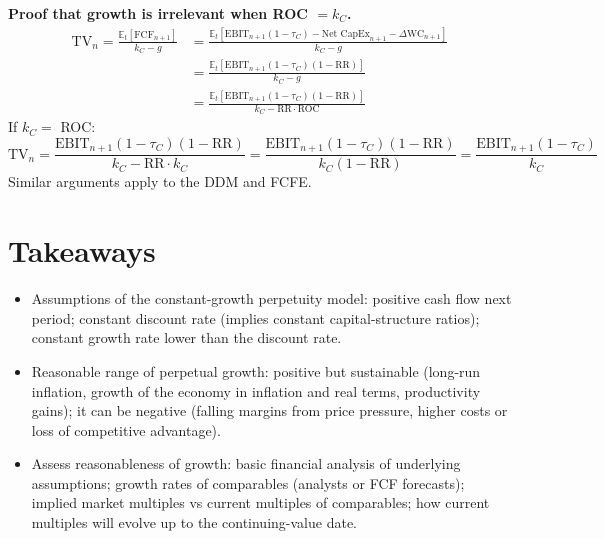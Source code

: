 \textbf{Proof that growth is irrelevant when ROC $=k_C$.}
\begin{align*}
\text{TV}_n=\frac{\mathbb{E}_t[\text{FCF}_{n+1}]}{k_C-g}&=\frac{\mathbb{E}_t[\text{EBIT}_{n+1}(1-\tau_C)-\text{Net CapEx}_{n+1}-\Delta\text{WC}_{n+1}]}{k_C-g}\\
&=\frac{\mathbb{E}_t[\text{EBIT}_{n+1}(1-\tau_C)(1-\text{RR})]}{k_C-g}\\
&=\frac{\mathbb{E}_t[\text{EBIT}_{n+1}(1-\tau_C)(1-\text{RR})]}{k_C-\text{RR}\cdot\text{ROC}}
\end{align*}
If $k_C=$ ROC:
\[
\text{TV}_n=\frac{\text{EBIT}_{n+1}(1-\tau_C)(1-\text{RR})}{k_C-\text{RR}\cdot k_C}=\frac{\text{EBIT}_{n+1}(1-\tau_C)(1-\text{RR})}{k_C(1-\text{RR})}=\frac{\text{EBIT}_{n+1}(1-\tau_C)}{k_C}
\]
Similar arguments apply to the DDM and FCFE.

\section{Takeaways}
\begin{itemize}
  \item Assumptions of the constant-growth perpetuity model: positive cash flow next period; constant discount rate (implies constant capital-structure ratios); constant growth rate lower than the discount rate.
  \item Reasonable range of perpetual growth: positive but sustainable (long-run inflation, growth of the economy in inflation and real terms, productivity gains); it can be negative (falling margins from price pressure, higher costs or loss of competitive advantage).
  \item Assess reasonableness of growth: basic financial analysis of underlying assumptions; growth rates of comparables (analysts or FCF forecasts); implied market multiples vs current multiples of comparables; how current multiples will evolve up to the continuing-value date.
\end{itemize}

